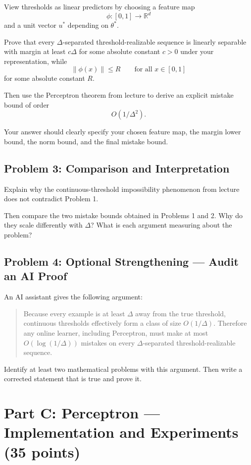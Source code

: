 \documentclass{article}
\begin{document}
View thresholds as linear predictors by choosing a feature map
$$
\phi : [0,1] \to \mathbb{R}^d
$$
and a unit vector $u^*$ depending on $\theta^*$.

Prove that every $\Delta$-separated threshold-realizable sequence is linearly separable with margin at least $c\Delta$ for some absolute constant $c>0$ under your representation, while
$$
\|\phi(x)\| \le R
\qquad \text{for all } x \in [0,1]
$$
for some absolute constant $R$.

Then use the Perceptron theorem from lecture to derive an explicit mistake bound of order
$$
O(1/\Delta^2).
$$

Your answer should clearly specify your chosen feature map, the margin lower bound, the norm bound, and the final mistake bound.

\subsection*{Problem 3: Comparison and Interpretation}

Explain why the continuous-threshold impossibility phenomenon from lecture does not contradict Problem 1.

Then compare the two mistake bounds obtained in Problems 1 and 2. Why do they scale differently with $\Delta$? What is each argument measuring about the problem?

\subsection*{Problem 4: Optional Strengthening --- Audit an AI Proof}

An AI assistant gives the following argument:

\begin{quote}
Because every example is at least $\Delta$ away from the true threshold, continuous thresholds effectively form a class of size $O(1/\Delta)$. Therefore any online learner, including Perceptron, must make at most $O(\log(1/\Delta))$ mistakes on every $\Delta$-separated threshold-realizable sequence.
\end{quote}

Identify at least two mathematical problems with this argument. Then write a corrected statement that is true and prove it.

\section{Part C: Perceptron --- Implementation and Experiments (35 points)}
\end{document}
